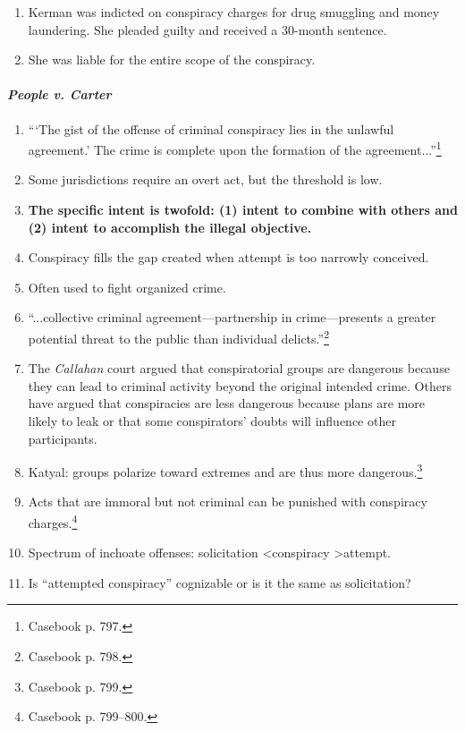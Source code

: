 \begin{enumerate}
    \item Kerman was indicted on conspiracy charges for drug smuggling and 
    money laundering. She pleaded guilty and received a 30-month sentence.
    \item She was liable for the entire scope of the conspiracy.
\end{enumerate}

\paragraph{\emph{People v. Carter}}

\begin{enumerate}
    \item ```The gist of the offense of criminal conspiracy lies in the 
    unlawful agreement.' The crime is complete upon the formation of the 
    agreement...''\footnote{Casebook p. 797.}
    \item Some jurisdictions require an overt act, but the threshold is low.
    \item \textbf{The specific intent is twofold: (1) intent to combine with 
    others and (2) intent to accomplish the illegal objective.}
    \item Conspiracy fills the gap created when attempt is too narrowly 
    conceived.
    \item Often used to fight organized crime.
    \item ``...collective criminal agreement---partnership in crime---presents 
    a greater potential threat to the public than individual 
    delicts.''\footnote{Casebook p. 798.}
    \item The \emph{Callahan} court argued that conspiratorial groups are 
    dangerous because they can lead to criminal activity beyond the original 
    intended crime. Others have argued that conspiracies are less dangerous 
    because plans are more likely to leak or that some conspirators' doubts 
    will influence other participants.
    \item Katyal: groups polarize toward extremes and are thus more 
    dangerous.\footnote{Casebook p. 799.}
    \item Acts that are immoral but not criminal can be punished with 
    conspiracy charges.\footnote{Casebook p. 799--800.}
    \item Spectrum of inchoate offenses: solicitation \textless conspiracy 
    \textgreater attempt.
    \item Is ``attempted conspiracy'' cognizable or is it the same as 
    solicitation?
\end{enumerate}

